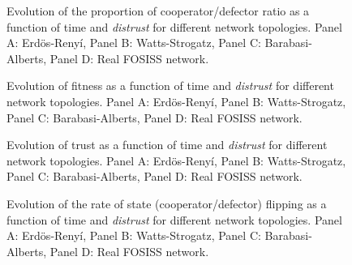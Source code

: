 \begin{figure}
\caption{Evolution of the proportion of cooperator/defector ratio as a function of time and \emph{distrust} for different network topologies. Panel A: Erd\"os-Reny\'i, Panel B: Watts-Strogatz, Panel C: Barabasi-Alberts, Panel D: Real FOSISS network.}
\label{fig:3}       %
\end{figure}

\FloatBarrier

\begin{figure}
\caption{Evolution of fitness as a function of time and \emph{distrust} for different network topologies. Panel A: Erd\"os-Reny\'i, Panel B: Watts-Strogatz, Panel C: Barabasi-Alberts, Panel D: Real FOSISS network.}
\label{fig:2}       %
\end{figure}

\FloatBarrier

\begin{figure}
\caption{Evolution of trust as a function of time and \emph{distrust} for different network topologies. Panel A: Erd\"os-Reny\'i, Panel B: Watts-Strogatz, Panel C: Barabasi-Alberts, Panel D: Real FOSISS network.}
\label{fig:1}       %
\end{figure}

\FloatBarrier


\begin{figure}
\caption{Evolution of the rate of state (cooperator/defector) flipping as a function of time and \emph{distrust} for different network topologies. Panel A: Erd\"os-Reny\'i, Panel B: Watts-Strogatz, Panel C: Barabasi-Alberts, Panel D: Real FOSISS network.}
\label{fig:4}       %
\end{figure}

\FloatBarrier



